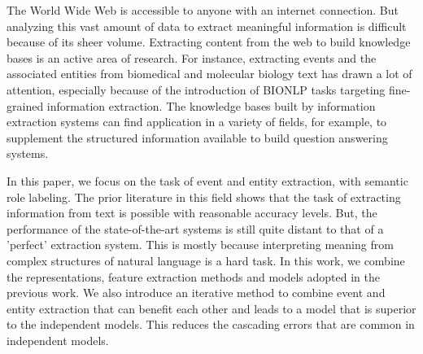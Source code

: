 The World Wide Web is accessible to anyone with an internet connection. But analyzing this vast amount of data to extract meaningful information is difficult because of its sheer volume. Extracting content from the web to build knowledge bases is an active area of research. For instance, extracting events and the associated entities from biomedical and molecular biology text has drawn a lot of attention, especially because of the introduction of BIONLP tasks targeting fine-grained information extraction.  The knowledge bases built by information extraction systems can find application in a variety of fields, for example, to supplement the structured information available to build question answering systems.

In this paper, we focus on the task of event and entity extraction, with semantic role labeling. The prior literature in this field shows that the task of extracting information from text is possible with reasonable accuracy levels.  But, the performance of the state-of-the-art systems is still quite distant to that of a ’perfect’ extraction system. This is mostly because interpreting meaning from complex structures of natural language is a hard task. In this work, we combine the representations, feature extraction methods and models adopted in the previous work. We also introduce an iterative method to combine event and entity extraction that can benefit each other and leads to a model that is superior to the independent models. This reduces the cascading errors that are common in independent models.